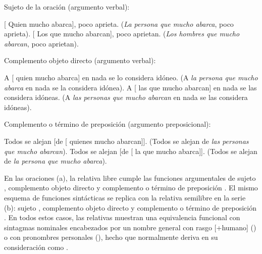 \begin{exe}
  \ex\label{ex:13-abarca-s} Sujeto de la oración (argumento verbal):
    \begin{xlist}
      \ex\label{ex:13-abarca-s-a} {}[ Quien mucho abarca], poco
          aprieta. (\textit{La persona que mucho abarca}, poco aprieta).
      \ex\label{ex:13-abarca-s-b} {}[ Los que mucho abarcan], poco
          aprietan. (\textit{Los hombres que mucho abarcan}, poco aprietan).
    \end{xlist}
  \ex\label{ex:13-abarca-cod} Complemento objeto directo (argumento verbal):
    \begin{xlist}
      \ex\label{ex:13-abarca-cod-a} A [ quien mucho abarca] en nada
          se lo considera idóneo. (A \textit{la persona que mucho abarca} en nada
          se la considera idónea).
      \ex\label{ex:13-abarca-cod-b} A [ las que mucho abarcan] en nada
          se las considera idóneas. (A \textit{las personas que mucho abarcan} en
          nada se las considera idóneas).
    \end{xlist}
  \ex\label{ex:13-abarca-ct} Complemento o término de preposición (argumento
      preposicional):
    \begin{xlist}
      \ex\label{ex:13-abarca-ct-a} Todos se alejan [de [ quienes mucho
          abarcan]]. (Todos se alejan de \textit{las personas que mucho
          abarcan}).
      \ex\label{ex:13-abarca-ct-b} Todos se alejan [de [ la que mucho
          abarca]]. (Todos se alejan de \textit{la persona que mucho abarca}).
    \end{xlist}
\end{exe}

En las oraciones (a), la relativa libre cumple las funciones argumentales de
sujeto , complemento objeto directo
 y complemento o término de preposición
. El mismo esquema de funciones sintácticas se replica
con la relativa semilibre en la serie (b): sujeto ,
complemento objeto directo  y complemento o término de
preposición . En todos estos casos, las relativas
muestran una equivalencia funcional con sintagmas nominales encabezados por un
nombre general con rasgo [+humano] () o con
pronombres personales (), hecho que normalmente
deriva en su consideración como .

